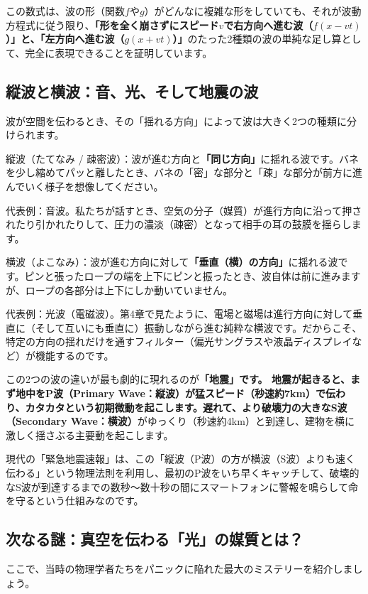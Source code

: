 この数式は、波の形（関数\(f\)や\(g\)）がどんなに複雑な形をしていても、それが波動方程式に従う限り、\textbf{「形を全く崩さずにスピード\(v\)で右方向へ進む波（\(f(x - vt)\)）」と、「左方向へ進む波（\(g(x + vt)\)）」}のたった2種類の波の単純な足し算として、完全に表現できることを証明しています。

\subsection{縦波と横波：音、光、そして地震の波}

波が空間を伝わるとき、その「揺れる方向」によって波は大きく2つの種類に分けられます。

縦波（たてなみ / 疎密波）：波が進む方向と\textbf{「同じ方向」}に揺れる波です。バネを少し縮めてパッと離したとき、バネの「密」な部分と「疎」な部分が前方に進んでいく様子を想像してください。

代表例：音波。私たちが話すとき、空気の分子（媒質）が進行方向に沿って押されたり引かれたりして、圧力の濃淡（疎密）となって相手の耳の鼓膜を揺らします。

横波（よこなみ）：波が進む方向に対して\textbf{「垂直（横）の方向」}に揺れる波です。ピンと張ったロープの端を上下にピンと振ったとき、波自体は前に進みますが、ロープの各部分は上下にしか動いていません。

代表例：光波（電磁波）。第4章で見たように、電場と磁場は進行方向に対して垂直に（そして互いにも垂直に）振動しながら進む純粋な横波です。だからこそ、特定の方向の揺れだけを通すフィルター（偏光サングラスや液晶ディスプレイなど）が機能するのです。

この2つの波の違いが最も劇的に現れるのが\textbf{「地震」です。 地震が起きると、まず地中をP波（Primary Wave：縦波）が猛スピード（秒速約7km）で伝わり、カタカタという初期微動を起こします。遅れて、より破壊力の大きなS波（Secondary Wave：横波）}がゆっくり（秒速約4km）と到達し、建物を横に激しく揺さぶる主要動を起こします。

現代の「緊急地震速報」は、この「縦波（P波）の方が横波（S波）よりも速く伝わる」という物理法則を利用し、最初のP波をいち早くキャッチして、破壊的なS波が到達するまでの数秒〜数十秒の間にスマートフォンに警報を鳴らして命を守るという仕組みなのです。

\subsection{次なる謎：真空を伝わる「光」の媒質とは？}
ここで、当時の物理学者たちをパニックに陥れた最大のミステリーを紹介しましょう。

